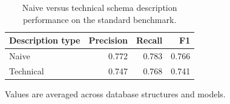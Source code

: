 \begin{table}[htbp]
\centering
\small
\caption{Naive versus technical schema description performance on the standard benchmark.}
\label{tab:schema-description-standard}
\begin{tabular}{lrrr}
\toprule
Description type & Precision & Recall & F1 \\
\midrule
Naive & 0.772 & 0.783 & 0.766 \\
Technical & 0.747 & 0.768 & 0.741 \\
\bottomrule
\end{tabular}
\par\footnotesize{Values are averaged across database structures and models.}
\end{table}
